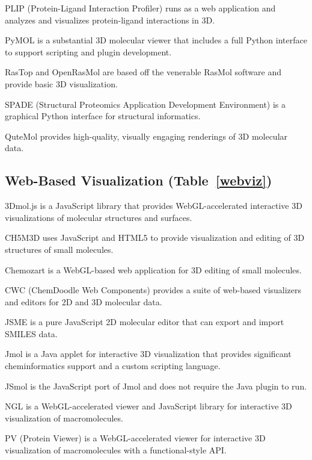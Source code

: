 PLIP (Protein-Ligand Interaction Profiler) \cite{Salentin_2015} runs as a web application and analyzes and visualizes protein-ligand interactions in 3D.

PyMOL is a substantial 3D molecular viewer that includes a full Python interface to support scripting and plugin development.

RasTop and OpenRasMol are based off the venerable RasMol software and provide basic 3D visualization. 

SPADE (Structural Proteomics Application Development Environment) \cite{sweeney2011computational} is a graphical Python interface for structural informatics.

QuteMol \cite{Tarini_2006} provides high-quality, visually engaging renderings of 3D molecular data.


\subsection*{Web-Based Visualization (Table~\ref{webviz})}

3Dmol.js \cite{Rego_2014} is a JavaScript library that provides WebGL-accelerated interactive 3D visualizations of molecular structures and surfaces.

CH5M3D \cite{Earley_2013} uses JavaScript and HTML5 to provide visualization and editing of 3D structures of small molecules.

Chemozart \cite{Mohebifar_2015} is a WebGL-based web application for 3D editing of small molecules.

CWC (ChemDoodle Web Components) \cite{Burger_2015} provides a suite of web-based visualizers and editors for 2D and 3D molecular data.

JSME \cite{Bienfait_2013} is a pure JavaScript 2D molecular editor that can export and import SMILES data.

Jmol \cite{Hanson_2010} is a Java applet for interactive 3D visualization that provides significant cheminformatics support and a custom scripting language.

JSmol \cite{Hanson_2013} is the JavaScript port of Jmol and does not require the Java plugin to run.

NGL \cite{Rose_2015} is a WebGL-accelerated viewer and JavaScript library for interactive 3D visualization of macromolecules.

PV (Protein Viewer) \cite{95f13b46-4e83-4cdd-afc0-6de07bca5ae8} is a WebGL-accelerated viewer for interactive 3D visualization of macromolecules with a functional-style API.





